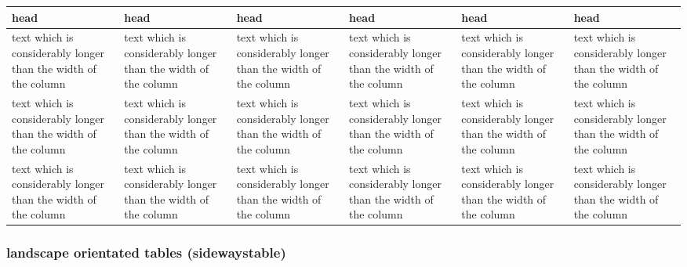 %



\begin{filecontents*}{\democodefile}

\begin{table}
\begin{center}
  \centering\small\renewcommand{\arraystretch}{1.4}\sffamily
  \captionsetup{type=table}
\begin{tabularx}{1.0\textwidth}{*{6}{X}}
\hline
\rowcolor{tableheadcolor}
head & head & head & head & head & head \\
\hline
text which is considerably longer than the width of the column & 
text which is considerably longer than the width of the column & 
text which is considerably longer than the width of the column &
text which is considerably longer than the width of the column & 
text which is considerably longer than the width of the column & 
text which is considerably longer than the width of the column \\
text which is considerably longer than the width of the column & 
text which is considerably longer than the width of the column & 
text which is considerably longer than the width of the column &
text which is considerably longer than the width of the column & 
text which is considerably longer than the width of the column & 
text which is considerably longer than the width of the column \\
text which is considerably longer than the width of the column & 
text which is considerably longer than the width of the column & 
text which is considerably longer than the width of the column &
text which is considerably longer than the width of the column & 
text which is considerably longer than the width of the column & 
text which is considerably longer than the width of the column \\
\hline
\end{tabularx}	
\end{center}
\end{table}
\end{filecontents*}

\subsubsection{landscape orientated tables (sidewaystable)}
\label{sec:tableLargeSidewaystable}

